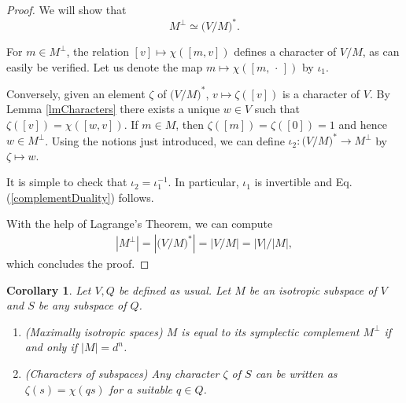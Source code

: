 \documentclass[aps,twocolumn,floatfix]{revtex4}
\newtheorem{corollary}[theorem]{Corollary}
\def\spacedot{\,\cdot\,}
\begin{document}
\begin{proof}
	We will show that
	\begin{equation}\label{complementDuality}
		M^\bot \simeq \big(V/M\big)^*.
	\end{equation}

	For $m\in M^\bot$, the relation
		$[v] \mapsto \chi([m,v])$
	defines a character of $V/M$, as can easily be verified. Let us
	denote the map $m\mapsto \chi([m,\spacedot])$ by $\iota_1$.

	Conversely, given an element $\zeta$ of $\big(V/M\big)^*$,
		$v \mapsto \zeta([v])$
	is a character of $V$. By Lemma \ref{lmCharacters} there exists a
	unique $w\in V$ such that $\zeta([v])=\chi([w,v])$. If $m\in M$,
	then $\zeta([m])=\zeta([0])=1$ and hence $w\in M^\bot$. Using the
	notions just introduced, we can define $\iota_2: \big(V/M\big)^* \to
	M^\bot$ by $\zeta \mapsto w$.

	It is simple to check that $\iota_2=\iota_1^{-1}$. In particular,
	$\iota_1$ is invertible and Eq. (\ref{complementDuality}) follows.

	With the help of Lagrange's Theorem, we can compute
	\begin{eqnarray*}
		\left| M^\bot \right| 
		= \left| \big(V/M\big)^* \right| 
		= \left| V/M \right| 
		= |V|/|M|,
	\end{eqnarray*}
	which concludes the proof.
\end{proof}


\begin{corollary}
	\label{crComplements}
	Let $V, Q$ be defined as usual. Let $M$ be an isotropic subspace of $V$ and
	$S$ be any subspace of $Q$.

	\begin{enumerate}
		\item\label{symplecticComplement}
		\emph{(Maximally isotropic spaces)}
		$M$ is equal to its symplectic complement $M^\bot$ if and only if
		$|M|=d^n$.

		\item\label{orthogonalComplement}
		\emph{(Characters of subspaces)}
		Any character $\zeta$ of $S$ can be written as $\zeta(s)=\chi(qs)$
		for a suitable $q\in Q$.
	\end{enumerate}
\end{corollary}
\end{document}
